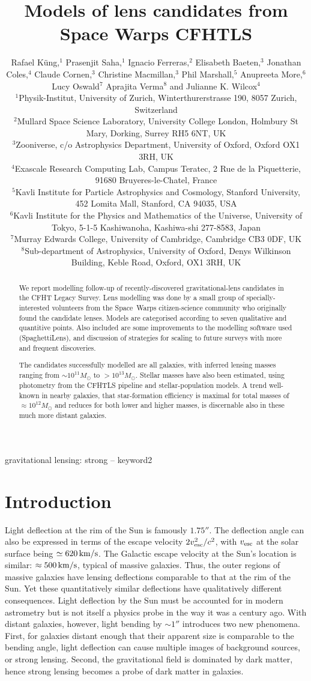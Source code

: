 \documentclass[fleqn,usenatbib]{mnras}
\title[Lens models for Space Warps CFHTLS]{Models of lens candidates from
  Space Warps CFHTLS}
\author[K\"ung et al]{Rafael K\"ung,$^{1}$
Prasenjit Saha,$^{1}$
Ignacio Ferreras,$^{2}$
Elisabeth Baeten,$^{3}$
\newauthor
Jonathan Coles,$^{4}$
Claude Cornen,$^{3}$
Christine Macmillan,$^{3}$
Phil Marshall,$^{5}$ 
\newauthor
Anupreeta More,$^{6}$
Lucy Oswald$^{7}$
Aprajita Verma$^{8}$
and Julianne K. Wilcox$^{4}$
%
\\
%
$^{1}$Physik-Institut, University of Zurich, Winterthurerstrasse 190, 8057 Zurich, Switzerland\\
$^{2}$Mullard Space Science Laboratory, University College London, Holmbury St Mary, Dorking, Surrey RH5 6NT, UK\\
$^{3}$Zooniverse, c/o Astrophysics Department, University of Oxford, Oxford OX1 3RH, UK \\
$^{4}$Exascale Research Computing Lab, Campus Teratec, 2 Rue de la Piquetterie, 91680 Bruyeres-le-Chatel, France\\
$^{5}$Kavli Institute for Particle Astrophysics and Cosmology, Stanford University, 452 Lomita Mall, Stanford, CA 94035, USA\\
$^{6}$Kavli Institute for the Physics and Mathematics of the Universe, University of Tokyo, 5-1-5 Kashiwanoha, Kashiwa-shi 277-8583, Japan\\
$^{7}$Murray Edwards College, University of Cambridge, Cambridge CB3 0DF, UK\\
$^{8}$Sub-department of Astrophysics, University of Oxford, Denys Wilkinson Building, Keble Road, Oxford, OX1 3RH, UK\\
}
\begin{document}
\label{firstpage}
\pagerange{\pageref{firstpage}--\pageref{lastpage}}
\maketitle

\begin{abstract}
We report modelling follow-up of recently-discovered
gravitational-lens candidates in the CFHT Legacy Survey.  Lens
modelling was done by a small group of specially-interested volunteers
from the Space~Warps citizen-science community who originally found
the candidate lenses.  Models are categorised according to seven
qualitative and quantitive points.  Also included are some
improvements to the modelling software used (SpaghettiLens),
and discussion of strategies for scaling to future surveys
with more and frequent discoveries.

The candidates successfully modelled are all galaxies, with inferred
lensing masses ranging from $\sim10^{11}M_\odot$ to $>10^{13}M_\odot$.
Stellar masses have also been estimated, using photometry from the
CFHTLS pipeline and stellar-population models.  A trend well-known
in nearby galaxies, that star-formation efficiency is maximal for
total masses of $\approx10^{12}M_\odot$ and reduces for both lower and
higher masses, is discernable also in these much more distant
galaxies.
\end{abstract}

\begin{keywords}
gravitational lensing: strong -- keyword2
\end{keywords}

\section{Introduction}

Light deflection at the rim of the Sun is famously $1.75''$.  The
deflection angle can also be expressed in terms of the escape velocity
$2v_{\rm esc}^2/c^2$, with $v_{\rm esc}$ at the solar surface being
$\simeq620\rm\,km/s$.  The Galactic escape velocity at the Sun's
location is similar: $\approx500\rm\,km/s$, typical of massive
galaxies.  Thus, the outer regions of massive galaxies have lensing
deflections comparable to that at the rim of the Sun.  Yet these
quantitatively similar deflections have qualitatively different
consequences.  Light deflection by the Sun must be accounted for in
modern astrometry \citep[see e.g.,][]{2015CQGra..32p5008C} but is not
itself a physics probe in the way it was a century ago.  With distant
galaxies, however, light bending by $\sim1''$ introduces two new
phenomena.  First, for galaxies distant enough that their apparent
size is comparable to the bending angle, light deflection can cause
multiple images of background sources, or strong lensing.  Second, the
gravitational field is dominated by dark matter, hence strong lensing
becomes a probe of dark matter in galaxies.
\end{document}
